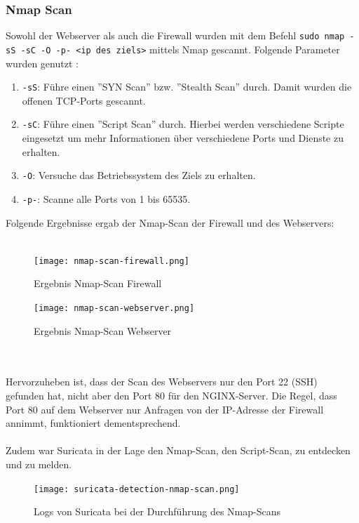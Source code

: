 \documentclass[
    a4paper,
    pagesize,
	pdftex,
    12pt,
]{scrartcl}
\begin{document}
\subsubsection{Nmap Scan}
Sowohl der Webserver als auch die Firewall wurden mit dem Befehl  \lstinline[breaklines]|sudo nmap -sS -sC -O -p- <ip des ziels>| mittels Nmap gescannt. 
Folgende Parameter wurden genutzt \cite{nmap-manual}:
\begin{enumerate}
	\item \lstinline[breaklines]|-sS|: Führe einen ''SYN Scan'' bzw. ''Stealth Scan'' durch. Damit wurden die offenen TCP-Ports gescannt. 
	\item \lstinline[breaklines]|-sC|: Führe einen ''Script Scan'' durch. Hierbei werden verschiedene Scripte eingesetzt um mehr Informationen über verschiedene Ports und Dienste zu erhalten.
	\item \lstinline[breaklines]|-O|: Versuche das Betriebssystem des Ziels zu erhalten.
	\item \lstinline[breaklines]|-p-|: Scanne alle Ports von 1 bis 65535.
\end{enumerate} 
Folgende Ergebnisse ergab der Nmap-Scan der Firewall und des Webservers: \\ \\
\begin{figure}[!ht]
	\centering
	\texttt{[image: nmap-scan-firewall.png]}
	\caption{Ergebnis Nmap-Scan Firewall}
	\label{fig:nmapfirewall}
\end{figure} 
\begin{figure}[!ht]
	\centering
	\texttt{[image: nmap-scan-webserver.png]}
	\caption{Ergebnis Nmap-Scan Webserver}
	\label{fig:nmapwebserver}
\end{figure}
\\ \\
Hervorzuheben ist, dass der Scan des Webservers nur den Port 22 (SSH) gefunden hat, nicht aber den Port 80 für den NGINX-Server. Die Regel, dass Port 80 auf dem Webserver nur Anfragen von der IP-Adresse der Firewall annimmt, funktioniert dementsprechend.
\\ \\
Zudem war Suricata in der Lage den Nmap-Scan, den Script-Scan, zu entdecken und zu melden.
\begin{figure}[!ht]
	\centering
	\texttt{[image: suricata-detection-nmap-scan.png]}
	\caption{Logs von Suricata bei der Durchführung des Nmap-Scans}
	\label{fig:nmapsuricata}
\end{figure}
\end{document}
